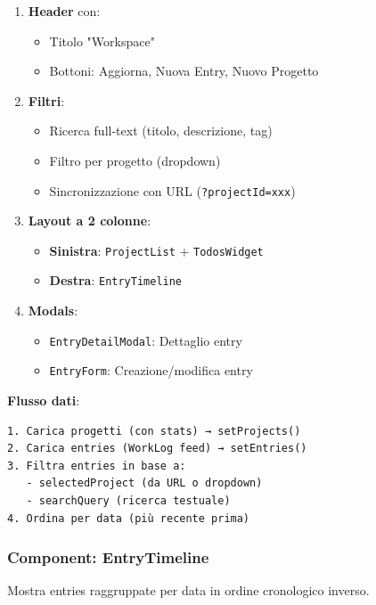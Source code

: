 \documentclass[11pt,a4paper]{article}
\begin{document}
\begin{enumerate}
    \item \textbf{Header} con:
    \begin{itemize}
        \item Titolo "Workspace"
        \item Bottoni: Aggiorna, Nuova Entry, Nuovo Progetto
    \end{itemize}
    
    \item \textbf{Filtri}:
    \begin{itemize}
        \item Ricerca full-text (titolo, descrizione, tag)
        \item Filtro per progetto (dropdown)
        \item Sincronizzazione con URL (\texttt{?projectId=xxx})
    \end{itemize}
    
    \item \textbf{Layout a 2 colonne}:
    \begin{itemize}
        \item \textbf{Sinistra}: \texttt{ProjectList} + \texttt{TodosWidget}
        \item \textbf{Destra}: \texttt{EntryTimeline}
    \end{itemize}
    
    \item \textbf{Modals}:
    \begin{itemize}
        \item \texttt{EntryDetailModal}: Dettaglio entry
        \item \texttt{EntryForm}: Creazione/modifica entry
    \end{itemize}
\end{enumerate}

\textbf{Flusso dati}:
\begin{lstlisting}
1. Carica progetti (con stats) → setProjects()
2. Carica entries (WorkLog feed) → setEntries()
3. Filtra entries in base a:
   - selectedProject (da URL o dropdown)
   - searchQuery (ricerca testuale)
4. Ordina per data (più recente prima)
\end{lstlisting}

\subsubsection{Component: EntryTimeline}

Mostra entries raggruppate per data in ordine cronologico inverso.
\end{document}
